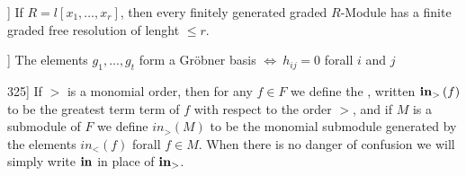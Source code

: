 \documentclass{article}
\begin{document}






\begin{thm}[Hilberts syzygy theorem\nocite[Eis1]{1.13} ]
	If \( R = l \left[ x_{1}, \dots ,x_{r} \right] \), 
then every finitely generated graded \( R\)-Module has a finite graded free resolution of lenght \( \le r  \).
\end{thm}



\begin{thm}[Buchberger's Criterion \nocite[Eis1]{15.8}]
	The elements \( g_1,\dots,g_t \) form a Gr\"obner basis \( \iff \ h_{ij}=0 \) forall \( i\) and \(j\)
\end{thm}


\begin{def}[initial term \nocite[Eis1]{325}]
	If \( > \) is a monomial order, then for any \( f \in F \) we define the , written \( \bold{in}_{>}\left( f \right) \) to be the greatest term term of \( f \) with respect to the order \( > \), and if \( M \) is a submodule of \( F\) we define \( in_{>}\left( M \right) \) to be the monomial submodule generated by the elements \( in_{<} \left( f \right) \) forall \( f \in M \). When there is no danger of confusion we will simply write \( \bold{in} \) in place of \( \bold{in}_{>} \).
\end{def}


\end{document}
